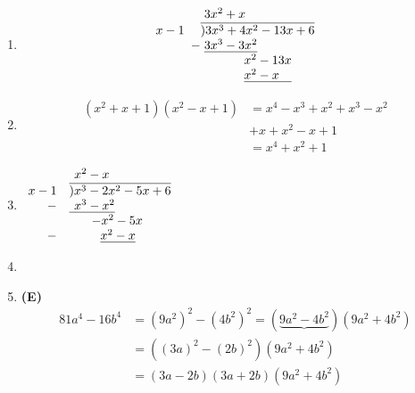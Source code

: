 \begin{multicols}{2}
\begin{enumerate}[label={\textbf{\arabic*.}}]
    \item 
    $$\begin{array}{rll}
        &\hspace{3pt} 3x^2 + x  \\
        x-1 \hspace{3pt}&\overline{)3x^3+4x^2-13x +6} \\
        -\hspace{-10pt}& \hspace{3pt} \underline{3x^3 - 3x^2} \\
        \hspace{-40pt} & \hspace{35pt}  x^2 - 13x \\ 
        & \hspace{35pt} \underline{x^2 - x \hspace{10pt}}
    \end{array}$$
    \item 
    \begin{align*}
        (x^2 + x + 1)(x^2 - x + 1) &= x^4 - x^3 + x ^2 + x^3 - x^2 \\
        &+ x + x^2 -x + 1 \\
        &= x^4 + x^2 + 1
        \end{align*}
    \item 
    $\begin{array}{rll}
         & \hspace{ 4 pt} x ^2 - x \\
        x -1 & \overline{) x^3 - 2x^2 - 5x + 6} \\
        - & \underline{ \hspace{4pt} x^ 3 - x^2} \\
        & \hspace{18pt} -x^2 - 5x  \\
       - &  \hspace{ 25pt} \underline{x^2 -x}
        

    \end{array}$
    \item 
    \item \textbf{(E)}
    \begin{align*} 
    81a^4 - 16b^4 &= (9a^2)^2 - (4b^2)^2 = (\underbrace{9a^2 - 4b^2})(9a^2 + 4b^2) \\
    & = ((3a)^2 - (2b)^2)(9a^2 + 4b^2) \\
    & = (3a - 2b)(3a + 2b)(9a^2 + 4b^2)
    \end{align*}
    

\end{enumerate}
\end{multicols}
